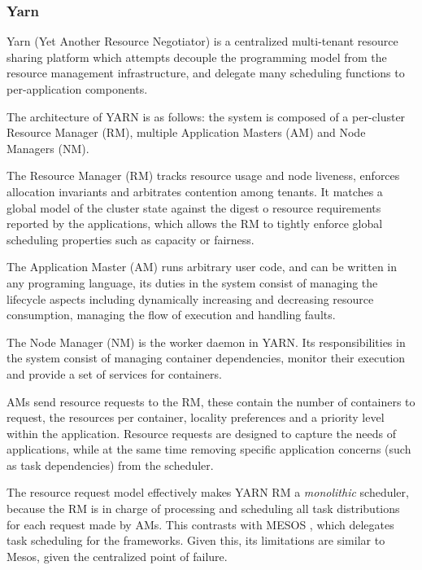 \subsubsection{Yarn}

Yarn (Yet Another Resource Negotiator) \cite{Vavilapalli2013ApacheHY} is a centralized multi-tenant resource sharing platform which attempts decouple the programming model from the resource management infrastructure, and delegate many scheduling functions to per-application components. 

The architecture of YARN is as follows: the system is composed of a per-cluster Resource Manager (RM), multiple Application Masters (AM) and Node Managers (NM). 

The Resource Manager (RM) tracks resource usage and node liveness, enforces allocation invariants and arbitrates contention among tenants. It matches a global model of the cluster state against the digest o resource requirements reported by the applications, which allows the RM to tightly enforce global scheduling properties such as capacity or fairness.

The Application Master (AM) runs arbitrary user code, and can be written in any programing language, its duties in the system consist of managing the lifecycle aspects including dynamically increasing and decreasing resource consumption, managing the flow of execution and handling faults. 

The Node Manager (NM) is the worker daemon in YARN. Its responsibilities in the system consist of managing container dependencies, monitor their execution and provide a set of services for containers. 

AMs send resource requests to the RM, these contain the number of containers to request, the resources per container, locality preferences and a priority level within the application. Resource requests are designed to capture the needs of applications, while at the same time removing specific application concerns (such as task dependencies) from the scheduler.

The resource request model effectively makes YARN RM a \textit{monolithic} scheduler, because the RM is in charge of processing and scheduling all task distributions for each request made by AMs. This contrasts with MESOS \cite{hindman2011mesos}, which delegates task scheduling for the frameworks. Given this, its limitations are similar to Mesos, given the centralized point of failure.


